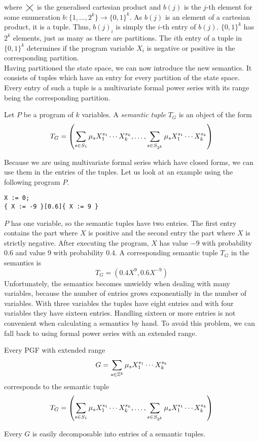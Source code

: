 where $\bigtimes$ is the generalised cartesian product and $b(j)$ is the $j$-th element for some enumeration $b \colon \{1, \ldots, 2^k \} \to \{0, 1\}^k$.
As $b(j)$ is an element of a cartesian product, it is a tuple.
Thus, $b(j)_i$ is simply the $i$-th entry of $b(j)$.
$\{0, 1\}^k$ has $2^k$ elements, just as many as there are partitions.
The $i$th entry of a tuple in $\{0, 1\}^k$ determines if the program variable $X_i$ is negative or positive in the corresponding partition. \\
Having partitioned the state space, we can now introduce the new semantics.
It consists of tuples which have an entry for every partition of the state space.
Every entry of such a tuple is a multivariate formal power series with its range being the corresponding partition.
\begin{definition}
	Let $P$ be a program of $k$ variables.
	A \emph{semantic tuple} $T_G$ is an object of the form
	\[ T_G = \left( \sum_{s \in S_1} \mu_s X_1^{s_1} \cdots X_k^{s_k}, \ldots,
		\sum_{s \in S_{2^k}} \mu_s X_1^{s_1} \cdots X_k^{s_k} \right) \]
\end{definition}
Because we are using multivariate formal series which have closed forms, we can use them in the entries of the tuples.
Let us look at an example using the following program $P$.
\begin{lstlisting}
X := 0;
{ X := -9 }[0.6]{ X := 9 }
\end{lstlisting}
$P$ has one variable, so the semantic tuples have two entries.
The first entry contains the part where $X$ is positive and the second entry the part where $X$ is strictly negative.
After executing the program, $X$ has value $-9$ with probability $0.6$ and value 9 with probability $0.4$.
A corresponding semantic tuple $T_G$ in the semantics is
\[ T_G = ( 0.4 X^9, 0.6 X^{-9} ) \]
Unfortunately, the semantics becomes unwieldy when dealing with many variables, because the number of entries grows exponentially in the number of variables.
With three variables the tuples have eight entries and with four variables they have sixteen entries.
Handling sixteen or more entries is not convenient when calculating a semantics by hand.
To avoid this problem, we can fall back to using formal power series with an extended range.
\begin{theorem}
	Every PGF with extended range
	\[ G = \sum_{s \in \mathbb{Z}^k } \mu_s X_1^{s_1} \cdots X_k^{s_k} \]
	corresponds to the semantic tuple
	\[ T_G = \left( \sum_{s \in S_1} \mu_s X_1^{s_1} \cdots X_k^{s_k}, \ldots, \sum_{s \in S_{2^k}} \mu_s X_1^{s_1} \cdots X_k^{s_k} \right) \]
\end{theorem}
Every $G$ is easily decomposable into entries of a semantic tuples.
